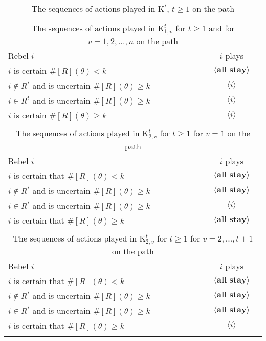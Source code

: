 \documentclass[12pt,letter]{article}
\newcommand{\Kappa}{\mathrm{K}}
\theoremstyle{definition}
\theoremstyle{remark}
\theoremstyle{claim}
\begin{document}
\begin{table}[!htbp]
\caption{The sequences of actions played in $\Kappa^t$, $t\geq 1$ on the path}
\label{Table_cdt}
\begin{center}
\begin{tabular}{l c}
\multicolumn{2}{c}{The sequences of actions played in $\Kappa^t_{1,v}$ for $t\geq 1$ and for $v=1,2,...,n$ on the path}\\
Rebel $i$ 	 	&  	$i$ plays		 \\
\hline
\hline
$i$ is certain $\#[R](\theta)<k$ 	& 	$\langle \textbf{all stay} \rangle$	\\
$i\notin R^{t}$ and is uncertain $\#[R](\theta)\geq k$	& 	$\langle i \rangle$	\\
$i\in R^{t}$ and is uncertain $\#[R](\theta)\geq k$ &  $\langle i \rangle$  \\
$i$ is certain $\#[R](\theta)\geq k$ &  $\langle i \rangle$  \\
\hline
\\
\multicolumn{2}{c}{The sequences of actions played in $\Kappa^t_{2,v}$ for $t\geq 1$ for $v=1$ on the path}\\
Rebel $i$ 	 	&  	$i$ plays		 \\
\hline
\hline
$i$ is certain that $\#[R](\theta)<k$ 	& 	$\langle \textbf{all stay} \rangle$	\\
$i\notin R^{t}$ and is uncertain $\#[R](\theta)\geq k$	& 	$\langle \textbf{all stay} \rangle$	\\
$i\in R^{t}$ and is uncertain $\#[R](\theta)\geq k$ &  $\langle i \rangle$  \\
$i$ is certain that $\#[R](\theta)\geq k$ &  $\langle \textbf{all stay} \rangle$  \\
\hline
\\
\multicolumn{2}{c}{The sequences of actions played in $\Kappa^t_{2,v}$ for $t\geq 1$ for $v=2,...,t+1$ on the path}\\
Rebel $i$ 	 	&  	$i$ plays		 \\
\hline
\hline
$i$ is certain that $\#[R](\theta)<k$ 	& 	$\langle \textbf{all stay} \rangle$	\\
$i\notin R^{t}$ and is uncertain $\#[R](\theta)\geq k$	& 	$\langle \textbf{all stay} \rangle$	\\
$i\in R^{t}$ and is uncertain $\#[R](\theta)\geq k$ &  $\langle \textbf{all stay} \rangle$  \\
$i$ is certain that $\#[R](\theta)\geq k$ &  $\langle i \rangle$  \\
\hline
\\

\end{tabular}
\end{center}
\end{table}
\end{document}
